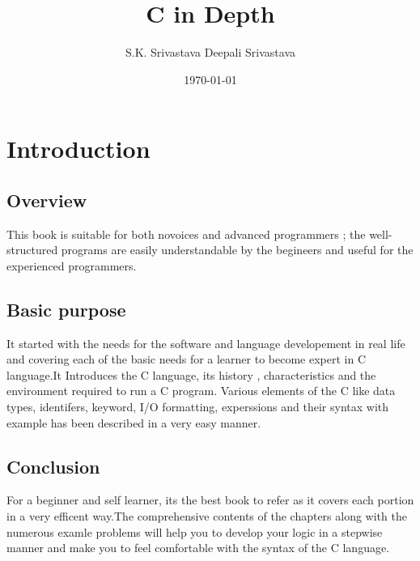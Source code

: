\documentclass[12pt]{article}
\title{C in Depth}
\author{S.K. Srivastava \tabularnewline \raggedleft Deepali Srivastava}
\date{\today}
\begin{document}
\maketitle
\begin{abstract}
\end{abstract}
\section{Introduction}
\subsection{Overview}
This book is suitable for both novoices and advanced programmers ; the well-structured programs are easily 
understandable by the begineers and useful for the experienced programmers.
\subsection{Basic purpose}
It started with the needs for the software and language developement in real life and covering each of the basic 
needs for a learner to become expert in C language.It Introduces the C language, its history , characteristics and 
the environment required to run a C program. Various elements of the C like data types, identifers, keyword, I/O
formatting, experssions and their syntax with example has been described in a very easy manner.
\subsection{Conclusion}
For a beginner and self learner, its the best book to refer as it covers each portion in a very efficent way.The comprehensive
contents of the chapters along with the numerous examle problems will help you to develop your logic in a stepwise manner 
and make you to feel comfortable with the syntax of the C language.
\end{document}
